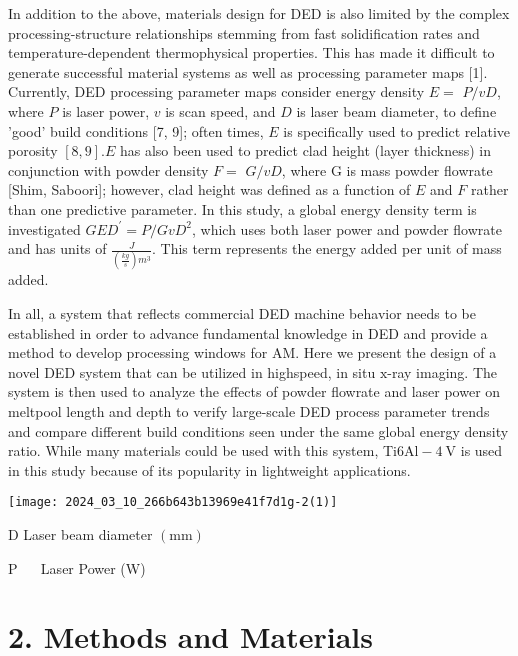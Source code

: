 \documentclass[10pt]{article}
\begin{document}
In addition to the above, materials design for DED is also limited by the complex processing-structure relationships stemming from fast solidification rates and temperature-dependent thermophysical properties. This has made it difficult to generate successful material systems as well as processing parameter maps [1]. Currently, DED processing parameter maps consider energy density $E=$ $P / v D$, where $P$ is laser power, $v$ is scan speed, and $D$ is laser beam diameter, to define 'good' build conditions [7, 9]; often times, $E$ is specifically used to predict relative porosity $[8,9] . E$ has also been used to predict clad height (layer thickness) in conjunction with powder density $F=$ $G / v D$, where $\mathrm{G}$ is mass powder flowrate [Shim, Saboori]; however, clad height was defined as a function of $E$ and $F$ rather than one predictive parameter. In this study, a global energy density term is investigated $G E D^{\prime}=P / G v D^{2}$, which uses both laser power and powder flowrate and has units of $\frac{J}{\left(\frac{k g}{s}\right) m^{3}}$. This term represents the energy added per unit of mass added.

In all, a system that reflects commercial DED machine behavior needs to be established in order to advance fundamental knowledge in DED and provide a method to develop processing windows for AM. Here we present the design of a novel DED system that can be utilized in highspeed, in situ $\mathrm{x}$-ray imaging. The system is then used to analyze the effects of powder flowrate and laser power on meltpool length and depth to verify large-scale DED process parameter trends and compare different build conditions seen under the same global energy density ratio. While many materials could be used with this system, Ti$6 \mathrm{Al}-4 \mathrm{~V}$ is used in this study because of its popularity in lightweight applications.

\begin{center}
\texttt{[image: 2024\_03\_10\_266b643b13969e41f7d1g-2(1)]}
\end{center}

D Laser beam diameter $(\mathrm{mm})$

P $\quad$ Laser Power (W)

\section*{2. Methods and Materials}
\end{document}
